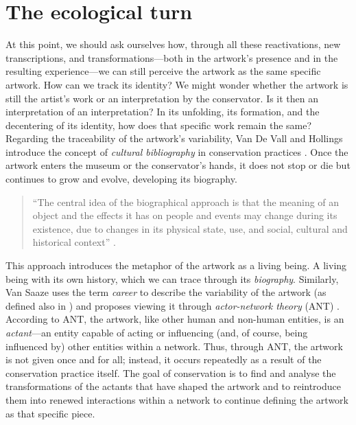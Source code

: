 \section{The ecological turn}
At this point, we should ask ourselves how, through all these reactivations, new transcriptions, and transformations—both in the artwork’s presence and in the resulting experience—we can still perceive the artwork as the same specific artwork. How can we track its identity? We might wonder whether the artwork is still the artist’s work or an interpretation by the conservator. Is it then an interpretation of an interpretation? In its unfolding, its formation, and the decentering of its identity, how does that specific work remain the same?\\
Regarding the traceability of the artwork’s variability, Van De Vall and Hollings introduce the concept of \textit{cultural bibliography} in conservation practices \cite{van2011reflections}. Once the artwork enters the museum or the conservator’s hands, it does not stop or die but continues to grow and evolve, developing its biography.
\begin{quote}
“The central idea of the biographical approach is that the meaning of an object and the effects it has on people and events may change during its existence, due to changes in its physical state, use, and social, cultural and historical context” \cite{van2011reflections}.  
\end{quote}
This approach introduces the metaphor of the artwork as a living being. A living being with its own history, which we can trace through its \textit{biography}. Similarly, Van Saaze uses the term \textit{career} to describe the variability of the artwork (as defined also in \cite{becker2006art}) and proposes viewing it through \textit{actor-network theory} (ANT) \cite{van2013installation}. According to ANT, the artwork, like other human and non-human entities, is an \textit{actant}—an entity capable of acting or influencing (and, of course, being influenced by) other entities within a network. Thus, through ANT, the artwork is not given once and for all; instead, it occurs repeatedly as a result of the conservation practice itself. The goal of conservation is to find and analyse the transformations of the actants that have shaped the artwork and to reintroduce them into renewed interactions within a network to continue defining the artwork as that specific piece.\\

